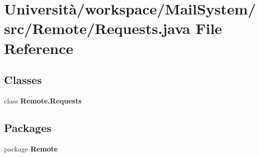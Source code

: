 \section{Università/workspace/\+Mail\+System/src/\+Remote/\+Requests.java File Reference}
\label{_requests_8java}
\subsection*{Classes}
\begin{DoxyCompactItemize}
\item 
class \textbf{ Remote.\+Requests}
\end{DoxyCompactItemize}
\subsection*{Packages}
\begin{DoxyCompactItemize}
\item 
package \textbf{ Remote}
\end{DoxyCompactItemize}
